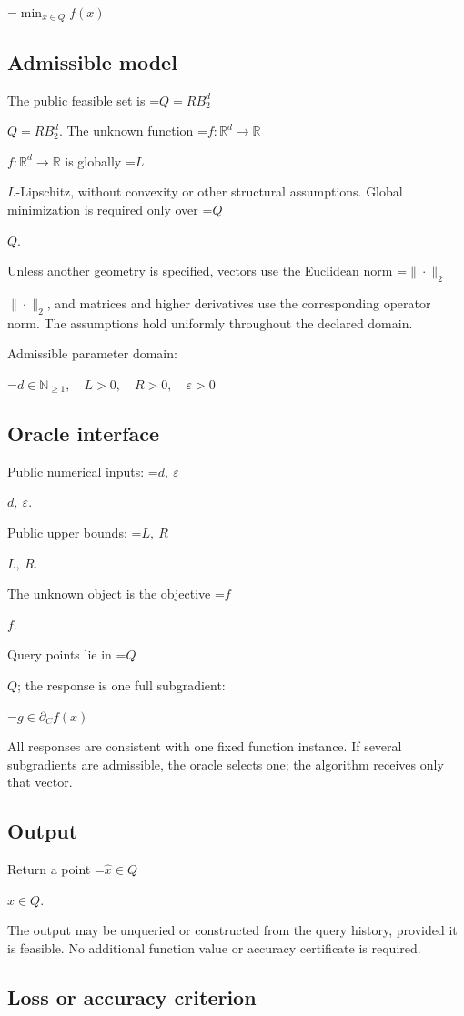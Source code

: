 \documentclass[10pt,a4paper]{article}
\newcommand{\AtlasMath}[1]{\par\begingroup\centering\setbox0=\hbox{$\displaystyle #1$}\ifdim\wd0>1.4\linewidth\typeout{ATLAS WIDE FORMULA: \the\wd0}\fi\ifdim\wd0>\linewidth\resizebox{\linewidth}{!}{\box0}\else\box0\fi\par\endgroup}
\newcommand{\AtlasInlineMath}[1]{\begingroup\setbox0=\hbox{$#1$}\ifdim\wd0>.4\linewidth\endgroup\AtlasMath{#1}\else\endgroup$#1$\fi}
\begin{document}
\AtlasMath{\min_{x\in Q}f(x)}


\subsection{Admissible model}
The public feasible set is \AtlasInlineMath{Q=RB_2^d}. The unknown function \AtlasInlineMath{f:\mathbb R^d\to\mathbb R} is globally \AtlasInlineMath{L}-Lipschitz, without convexity or other structural assumptions. Global minimization is required only over \AtlasInlineMath{Q}.

Unless another geometry is specified, vectors use the Euclidean norm \AtlasInlineMath{\|\cdot\|_2}, and matrices and higher derivatives use the corresponding operator norm. The assumptions hold uniformly throughout the declared domain.

Admissible parameter domain:


\AtlasMath{d\in\mathbb{N}_{\ge1},\quad L>0,\quad R>0,\quad \varepsilon>0}


\subsection{Oracle interface}
Public numerical inputs: \AtlasInlineMath{d,\ \varepsilon}.

Public upper bounds: \AtlasInlineMath{L,\ R}.

The unknown object is the objective \AtlasInlineMath{f}.

Query points lie in \AtlasInlineMath{Q}; the response is one full subgradient:


\AtlasMath{g\in\partial_C f(x)}


All responses are consistent with one fixed function instance. If several subgradients are admissible, the oracle selects one; the algorithm receives only that vector.

\subsection{Output}
Return a point \AtlasInlineMath{\widehat x\in Q}.

The output may be unqueried or constructed from the query history, provided it is feasible. No additional function value or accuracy certificate is required.

\subsection{Loss or accuracy criterion}
\end{document}
